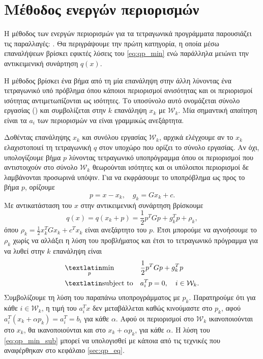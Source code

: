 \section{Μέθοδος ενεργών περιορισμών}
Η μέθοδος των ενεργών περιορισμών για τα τετραγωνικά προγράμματα παρουσιάζει τις
παραλλαγές: . Θα περιγράψουμε την πρώτη κατηγορία,
η οποία μέσω επαναλήψεων βρίσκει εφικτές λύσεις του \eqref{eq:qp_min} ενώ παράλληλα μειώνει την
αντικειμενική συνάρτηση $q(x)$.

Η μέθοδος βρίσκει ένα βήμα από τη μία επανάληψη στην άλλη λύνοντας ένα
τετραγωνικό υπό πρόβλημα όπου κάποιοι περιορισμοί ανισότητας και οι περιορισμοί
ισότητας αντιμετωπίζονται ως ισότητες. Το υποσύνολο αυτό ονομάζεται σύνολο
εργασίας () και συμβολίζεται στην $k$ επανάληψη $x_k$ με $\mathcal{W}_k$. Μία
σημαντική απαίτηση είναι τα $a_i$ των περιορισμών να είναι γραμμικώς ανεξάρτητα.

Δοθέντας επανάληψης $x_k$ και συνόλου εργασίας $\mathcal{W}_k$, αρχικά ελέγχουμε
αν το $x_k$ ελαχιστοποιεί τη τετραγωνική $q$ στον υποχώρο που ορίζει το σύνολο
εργασίας. Αν όχι, υπολογίζουμε βήμα $p$ λύνοντας τετραγωνικό υποπρόγραμμα όπου
οι περιορισμοί που αντιστοιχούν στο σύνολο $\mathcal{W}_k$ θεωρούνται ισότητες
και οι υπόλοιποι περιορισμοί δε λαμβάνονται προσωρινά υπόψιν. Για να εκφράσουμε
το υποπρόβλημα ως προς το βήμα $p$, ορίζουμε
\begin{equation*}
    p = x - x_k, \quad g_k= Gx_k + c.
\end{equation*}
Με αντικατάσταση του $x$ στην αντικειμενική συνάρτηση βρίσκουμε
\begin{equation*}
    q(x) = q(x_k + p) = \frac{1}{2}p^TGp + g_k^Tp + \rho_k,
\end{equation*}
όπου $\rho_k = \frac{1}{2} x^T_kGx_k + c^Tx_k$ είναι ανεξάρτητο του $p$. Έτσι
μπορούμε να αγνοήσουμε το $\rho_k$ χωρίς να αλλάξει η λύση του προβλήματος και
έτσι το τετραγωνικό πρόγραμμα για να λυθεί στην $k$ επανάληψη είναι
\begin{equation}\label{eq:qp_min_sub}
    \begin{aligned}
        & \underset{p}{\text{\tl{min}}}
        & & \frac{1}{2}p^TGp + g^T_kp \\
        & \text{\tl{subject to}}
        & & a^T_ip = 0, \quad i \in \mathcal{W}_k.
    \end{aligned}
\end{equation}
Συμβολίζουμε τη λύση του παραπάνω υποπρογράμματος με $p_k$. Παρατηρούμε ότι για
κάθε $i \in \mathcal{W}_k$, η τιμή του $a_i^Tx$ δεν μεταβάλλεται καθώς
κινούμαστε στο $p_k$, αφού $a_i^T(x_k + \alpha p_k) = a_i^T = b_i$ για κάθε
$\alpha$. Αφού οι περιορισμοί στο $\mathcal{W}_k$ ικανοποιούνται στο $x_k$, θα
ικανοποιούνται και στο $x_k + \alpha p_k$, για κάθε $\alpha$. Η λύση του
\eqref{eq:qp_min_sub} μπορεί να υπολογισθεί με κάποια από τις τεχνικές που
αναφέρθηκαν στο κεφάλαιο \ref{sec:qp_eq}.

